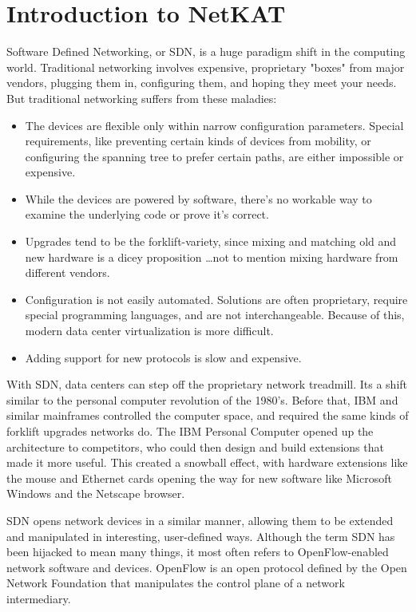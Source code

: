\chapter{Introduction to NetKAT}

Software Defined Networking, or SDN, is a huge paradigm shift in the computing world.  
Traditional networking involves 
expensive, proprietary "boxes" from major vendors, plugging them in, configuring them, and hoping they 
meet your needs.  
But traditional networking suffers from these maladies:

\begin{itemize}
\item The devices are flexible only within narrow configuration parameters. 
Special requirements, like preventing certain kinds of devices from mobility, or configuring 
the spanning tree to prefer certain paths, are either impossible or expensive.
\item While the devices are powered by software, there's no workable way to examine the underlying code or prove it's correct.  
\item Upgrades tend to be the forklift-variety, since mixing and matching old and new hardware is a dicey proposition
\ldots not to mention mixing hardware from different vendors.
\item Configuration is not easily automated. 
Solutions are often proprietary, require special programming languages, and are not interchangeable.
Because of this, modern data center virtualization is more difficult.
\item Adding support for new protocols is slow and expensive.
\end{itemize}

With SDN, data centers can step off the proprietary network treadmill.  
Its a shift similar to the personal computer revolution of the 1980's.
Before that, IBM and similar mainframes controlled the computer space, and required the same kinds of 
forklift upgrades networks do.
The IBM Personal Computer opened up the architecture to competitors, who could then design and build extensions
that made it more useful.
This created a snowball effect, with hardware extensions like the mouse and Ethernet cards opening the way 
for new software like Microsoft Windows and the Netscape browser.

SDN opens network devices in a similar manner, allowing them to be extended and manipulated in interesting,
user-defined ways.
Although the term SDN has been hijacked to mean many things, it most often refers to OpenFlow-enabled 
network software and devices.
OpenFlow is an open protocol defined by the Open Network Foundation that manipulates the control 
plane of a network intermediary.  

